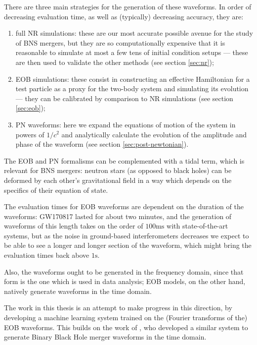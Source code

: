 \documentclass[main.tex]{subfiles}
\begin{document}
There are three main strategies for the generation of these waveforms. In order of decreasing evaluation time, as well as (typically) decreasing accuracy, they are:
\begin{enumerate}
    \item full \ac{NR} simulations: these are our most accurate possible avenue for the study of \ac{BNS} mergers, but they are so computationally expensive that it is reasonable to simulate at most a few tens of initial condition setups --- these are then used to validate the other methods (see section \ref{sec:nr});
    \item \ac{EOB} simulations: these consist in constructing an effective Hamiltonian for a test particle as a proxy for the two-body system and simulating its evolution --- they can be calibrated by comparison to \ac{NR} simulations (see section \ref{sec:eob});
    \item \ac{PN} waveforms: here we expand the equations of motion of the system in powers of $1/c^2$ and analytically calculate the evolution of the amplitude and phase of the waveform (see section \ref{sec:post-newtonian}).
\end{enumerate}

The \ac{EOB} and \ac{PN} formalisms can be complemented with a tidal term, which is relevant for \ac{BNS} mergers: neutron stars (as opposed to black holes) can be deformed by each other's gravitational field in a way which depends on the specifics of their equation of state. 

The evaluation times for \ac{EOB} waveforms are dependent on the duration of the waveforms: GW170817 lasted for about two minutes, and the generation of waveforms of this length takes on the order of $100\text{ms}$ with state-of-the-art systems, but as the noise in ground-based interferometers decreases we expect to be able to see a longer and longer section of the waveform, which might bring the evaluation times back above $1\text{s}$. 

Also, the waveforms ought to be generated in the frequency domain, since that form is the one which is used in data analysis;
EOB models, on the other hand, natively generate waveforms in the time domain. 

The work in this thesis is an attempt to make progress in this direction, by developing a machine learning system trained on the (Fourier transforms of the) \ac{EOB} waveforms. 
This builds on the work of \textcite{schmidtMachineLearningGravitational2020}, who developed a similar system to generate Binary Black Hole merger waveforms in the time domain.
\end{document}
